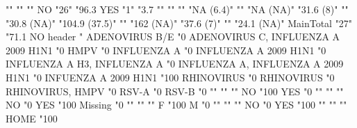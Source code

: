 \documentclass{article}\usepackage[]{graphicx}\usepackage[]{color}
\begin{document}
                                    ""             ""      ""         
NO                                  "26"           "96.3%
YES                                 "1"            "3.7%
                                    ""             ""      ""         
                                    "NA (6.4)"     ""      "NA (NA)"  
                                    "31.6 (8)"     ""      "30.8 (NA)"
                                    "104.9 (37.5)" ""      "162 (NA)" 
                                    "37.6 (7)"     ""      "24.1 (NA)"
MainTotal                           "27"           "71.1%
                                    NO  %
header                              "%
ADENOVIRUS B/E                      "0%
ADENOVIRUS C, INFLUENZA A 2009 H1N1 "0%
HMPV                                "0%
INFLUENZA A                         "0%
INFLUENZA A 2009 H1N1               "0%
INFLUENZA A H3, INFLUENZA A         "0%
INFLUENZA A, INFLUENZA A 2009 H1N1  "0%
INFUENZA A 2009 H1N1                "100%
RHINOVIRUS                          "0%
RHINOVIRUS                          "0%
RHINOVIRUS, HMPV                    "0%
RSV-A                               "0%
RSV-B                               "0%
                                    ""     ""             ""     
NO                                  "100%
YES                                 "0%
                                    ""     ""             ""     
NO                                  "0%
YES                                 "100%
Missing                             "0%
                                    ""     ""             ""     
F                                   "100%
M                                   "0%
                                    ""     ""             ""     
NO                                  "0%
YES                                 "100%
                                    ""     ""             ""     
HOME                                "100%
\end{document}
